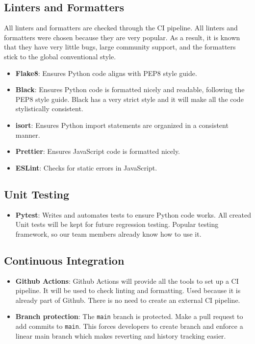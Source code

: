 \documentclass{article}
\begin{document}
\subsection{Linters and Formatters}
All linters and formatters are checked through the CI pipeline. All linters and formatters were
chosen because they are very popular. As a result, it is known that they have very little bugs, 
large community support, and the formatters stick to the global conventional style.
\begin{itemize}
  \item \textbf{Flake8}: Ensures Python code aligns with PEP8 style guide.
  \item \textbf{Black}: Ensures Python code is formatted nicely and readable, following the PEP8
    style guide. Black has a very strict style and it will make all the code stylistically 
    consistent.
  \item \textbf{isort}: Ensures Python import statements are organized in a consistent manner.
  \item \textbf{Prettier}: Ensures JavaScript code is formatted nicely.
  \item \textbf{ESLint}: Checks for static errors in JavaScript.
\end{itemize}

\subsection{Unit Testing}
\begin{itemize}
  \item \textbf{Pytest}: Writes and automates tests to ensure Python code works. All created Unit 
  tests will be kept for future regression testing. Popular testing framework, so our team members
  already know how to use it.
\end{itemize}

\subsection{Continuous Integration}
\begin{itemize}
  \item \textbf{Github Actions}: Github Actions will provide all the tools to set up a CI pipeline.
    It will be used to check linting and formatting. Used because it is already part of Github.
    There is no need to create an external CI pipeline.
  \item \textbf{Branch protection}: The \verb|main| branch is protected. Make a pull request to
    add commits to \verb|main|. This forces developers to create branch and enforce a linear main 
    branch which makes reverting and history tracking easier.
\end{itemize}
\end{document}

